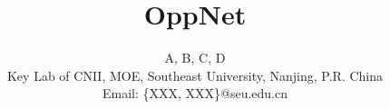 \documentclass[10pt, conference, letterpaper]{IEEEtran}
\begin{document}


\title{
OppNet
}
\author{
A, B, C, D\\
Key Lab of CNII, MOE, Southeast University, Nanjing, P.R. China\\
Email: \{XXX, XXX\}@seu.edu.cn
}
\maketitle







\end{document}
